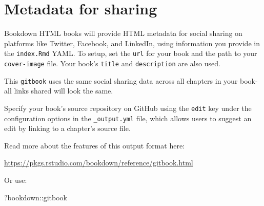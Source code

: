 \documentclass[
]{book}
\newenvironment{Shaded}{\begin{snugshade}}{\end{snugshade}}
\newcommand{\NormalTok}[1]{#1}
\newcommand{\SpecialCharTok}[1]{\textcolor[rgb]{0.00,0.00,0.00}{#1}}
\theoremstyle{definition}
\theoremstyle{definition}
\theoremstyle{definition}
\theoremstyle{definition}
\theoremstyle{remark}
\begin{document}
\hypertarget{metadata-for-sharing}{%
\section{Metadata for sharing}\label{metadata-for-sharing}}

Bookdown HTML books will provide HTML metadata for social sharing on platforms like Twitter, Facebook, and LinkedIn, using information you provide in the \texttt{index.Rmd} YAML. To setup, set the \texttt{url} for your book and the path to your \texttt{cover-image} file. Your book's \texttt{title} and \texttt{description} are also used.

This \texttt{gitbook} uses the same social sharing data across all chapters in your book- all links shared will look the same.

Specify your book's source repository on GitHub using the \texttt{edit} key under the configuration options in the \texttt{\_output.yml} file, which allows users to suggest an edit by linking to a chapter's source file.

Read more about the features of this output format here:

\url{https://pkgs.rstudio.com/bookdown/reference/gitbook.html}

Or use:

\begin{Shaded}
\begin{Highlighting}[]
\NormalTok{?bookdown}\SpecialCharTok{::}\NormalTok{gitbook}
\end{Highlighting}
\end{Shaded}


  
\end{document}
